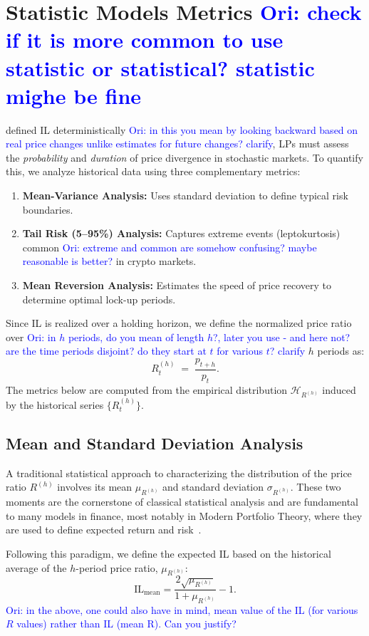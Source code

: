 \documentclass[journal]{IEEEtran}
\newcommand{\ori}[1]{\textcolor{blue}{Ori: #1}}
\begin{document}
\section{Statistic Models Metrics \ori{check if it is more common to use statistic or statistical? statistic mighe be fine}}
\label{sec:metrics}

defined IL deterministically \ori{in this you mean by looking backward based on real price changes unlike estimates for future changes? clarify}, LPs must assess the \textit{probability} and \textit{duration} of price divergence in stochastic markets. To quantify this, we analyze historical data using three complementary metrics:
\begin{enumerate}
    \item \textbf{Mean-Variance Analysis:} Uses standard deviation to define typical risk boundaries.
    \item \textbf{Tail Risk (5–95\%) Analysis:} Captures extreme events (leptokurtosis) common \ori{extreme and common are somehow confusing? maybe reasonable is better?} in crypto markets.
    \item \textbf{Mean Reversion Analysis:} Estimates the speed of price recovery to determine optimal lock-up periods.
\end{enumerate}

Since IL is realized over a holding horizon, we define the normalized price ratio over \ori{in $h$ periods, do you mean of length $h$?, later you use - and here not? are the time periods disjoint? do they start at $t$ for various $t$? clarify } \(h\) periods as:
$$
    R^{(h)}_{t} \;=\; \frac{p_{t+h}}{p_t}.
$$
The metrics below are computed from the empirical distribution \(\mathcal{H}_{R^{(h)}}\) induced by the historical series \(\{R^{(h)}_{t}\}\).


\subsection{Mean and Standard Deviation Analysis}
A traditional statistical approach to characterizing the distribution of the price ratio \(R^{(h)}\) involves its mean \(\mu_{R^{(h)}}\) and standard deviation \(\sigma_{R^{(h)}}\). These two moments are the cornerstone of classical statistical analysis and are fundamental to many models in finance, most notably in Modern Portfolio Theory, where they are used to define expected return and risk~\cite{markowitz1952portfolio, ross2014introduction}.

Following this paradigm, we define the expected IL based on the historical average of the \(h\)-period price ratio, \(\mu_{R^{(h)}}\): 
\begin{equation}
\label{eq:il_mean}
\mathrm{IL}_{\text{mean}} = \frac{2\sqrt{\mu_{R^{(h)}}}}{1+\mu_{R^{(h)}}} - 1.
\end{equation}
\ori{in the above, one could also have in mind, mean value of the IL (for various $R$ values) rather than IL (mean R). Can you justify?}
\end{document}
